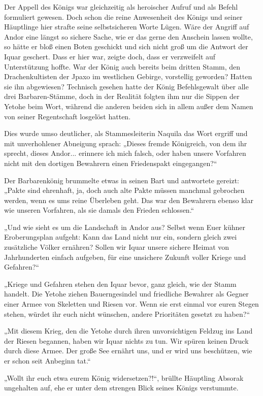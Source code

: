Der Appell des Königs war gleichzeitig als heroischer Aufruf und als Befehl formuliert gewesen. Doch schon die reine Anwesenheit des Königs und seiner Häuptlinge hier strafte seine selbstsicheren Worte Lügen. Wäre der Angriff auf Andor eine längst so sichere Sache, wie er das gerne den Anschein lassen wollte, so hätte er bloß einen Boten geschickt und sich nicht groß um die Antwort der Iquar geschert. Dass er hier war, zeigte doch, dass er verzweifelt auf Unterstützung hoffte. War der König auch bereits beim dritten Stamm, den Drachenkultisten der Jpaxo im westlichen Gebirge, vorstellig geworden? Hatten sie ihn abgewiesen? Technisch gesehen hatte der König Befehlsgewalt über alle drei Barbaren-Stämme, doch in der Realität folgten ihm nur die Sippen der Yetohe beim Wort, während die anderen beiden sich in allem außer dem Namen von seiner Regentschaft losgelöst hatten.

Dies wurde umso deutlicher, als Stammesleiterin Naquila das Wort ergriff und mit unverhohlener Abneigung sprach: „Dieses fremde Königreich, von dem ihr sprecht, dieses Andor... erinnere ich mich falsch, oder haben unsere Vorfahren nicht mit den dortigen Bewahrern einen Friedenspakt eingegangen?“

Der Barbarenkönig brummelte etwas in seinen Bart und antwortete gereizt: „Pakte sind ehrenhaft, ja, doch auch alte Pakte müssen manchmal gebrochen werden, wenn es ums reine Überleben geht. Das war den Bewahrern ebenso klar wie unseren Vorfahren, als sie damals den Frieden schlossen.“

„Und wie sieht es um die Landschaft in Andor aus? Selbst wenn Euer kühner Eroberungsplan aufgeht: Kann das Land nicht nur ein, sondern gleich zwei zusätzliche Völker ernähren? Sollen wir Iquar unsere sichere Heimat von Jahrhunderten einfach aufgeben, für eine unsichere Zukunft voller Kriege und Gefahren?“

„Kriege und Gefahren stehen den Iquar bevor, ganz gleich, wie der Stamm handelt. Die Yetohe ziehen Bauerngesindel und friedliche Bewahrer als Gegner einer Armee von Skeletten und Riesen vor. Wenn sie erst einmal vor euren Stegen stehen, würdet ihr euch nicht wünschen, andere Prioritäten gesetzt zu haben?“

„Mit diesem Krieg, den die Yetohe durch ihren unvorsichtigen Feldzug ins Land der Riesen begannen, haben wir Iquar nichts zu tun. Wir spüren keinen Druck durch diese Armee. Der große See ernährt uns, und er wird uns beschützen, wie er schon seit Anbeginn tat.“

„Wollt ihr euch etwa eurem König widersetzen?!“, brüllte Häuptling Absorak ungehalten auf, ehe er unter dem strengen Blick seines Königs verstummte.

